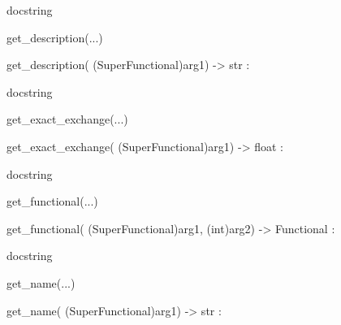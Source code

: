 \documentclass[letterpaper,10pt,english]{sphinxmanual}
\begin{document}
\begin{description}
\begin{description}
\begin{DUlineblock}{0em}
\begin{DUlineblock}{\DUlineblockindent}
\begin{DUlineblock}{\DUlineblockindent}
\item[] docstring
\item[] 
\end{DUlineblock}
\end{DUlineblock}
\item[] get\_description(...)
\item[]
\begin{DUlineblock}{\DUlineblockindent}
\item[] get\_description( (SuperFunctional)arg1) -\textgreater{} str :
\item[]
\begin{DUlineblock}{\DUlineblockindent}
\item[] docstring
\item[] 
\end{DUlineblock}
\end{DUlineblock}
\item[] get\_exact\_exchange(...)
\item[]
\begin{DUlineblock}{\DUlineblockindent}
\item[] get\_exact\_exchange( (SuperFunctional)arg1) -\textgreater{} float :
\item[]
\begin{DUlineblock}{\DUlineblockindent}
\item[] docstring
\item[] 
\end{DUlineblock}
\end{DUlineblock}
\item[] get\_functional(...)
\item[]
\begin{DUlineblock}{\DUlineblockindent}
\item[] get\_functional( (SuperFunctional)arg1, (int)arg2) -\textgreater{} Functional :
\item[]
\begin{DUlineblock}{\DUlineblockindent}
\item[] docstring
\item[] 
\end{DUlineblock}
\end{DUlineblock}
\item[] get\_name(...)
\item[]
\begin{DUlineblock}{\DUlineblockindent}
\item[] get\_name( (SuperFunctional)arg1) -\textgreater{} str :
\item[]
\begin{DUlineblock}{\DUlineblockindent}

\end{DUlineblock}
\end{DUlineblock}
\end{DUlineblock}
\end{description}
\end{description}
\end{document}
